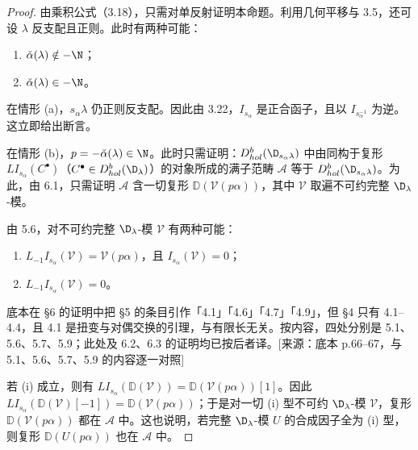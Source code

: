 \begin{proof}
由乘积公式（3.18），只需对单反射证明本命题。利用几何平移与 3.5，还可设 $\lambda$ 反支配且正则。此时有两种可能：
\begin{enumerate}[label=(\alph*)]
\item $\check{\alpha}(\lambda)\notin-\N$；
\item $\check{\alpha}(\lambda)\in-\N$。
\end{enumerate}
在情形 (a)，$s_\alpha\lambda$ 仍正则反支配。因此由 3.22，$I_{s_\alpha}$ 是正合函子，且以 $I_{s_\alpha^{-1}}$ 为逆。这立即给出断言。

在情形 (b)，$p=-\check{\alpha}(\lambda)\in\N$。此时只需证明：$D^b_{hol}(\D_{s_\alpha\lambda})$ 中由同构于复形 $LI_{s_\alpha}(C^\bullet)$（$C^\bullet\in D^b_{hol}(\D_\lambda)$）的对象所成的满子范畴 $\mathcal{A}$ 等于 $D^b_{hol}(\D_{s_\alpha\lambda})$。为此，由 6.1，只需证明 $\mathcal{A}$ 含一切复形 $\mathbb{D}(\mathcal{V}(p\alpha))$，其中 $\mathcal{V}$ 取遍不可约完整 $\D_\lambda$-模。

由 5.6，对不可约完整 $\D_\lambda$-模 $\mathcal{V}$ 有两种可能：
\begin{enumerate}[label=(\roman*)]
\item $L_{-1}I_{s_\alpha}(\mathcal{V})=\mathcal{V}(p\alpha)$，且 $I_{s_\alpha}(\mathcal{V})=0$；
\item $L_{-1}I_{s_\alpha}(\mathcal{V})=0$。
\end{enumerate}
\begin{annote}
底本在 §6 的证明中把 §5 的条目引作「4.1」「4.6」「4.7」「4.9」，但 §4 只有 4.1–4.4，且 4.1 是扭变与对偶交换的引理，与有限长无关。按内容，四处分别是 5.1、5.6、5.7、5.9；此处及 6.2、6.3 的证明均已按后者译。[来源：底本 p.66–67，与 5.1、5.6、5.7、5.9 的内容逐一对照]
\end{annote}
若 (i) 成立，则有 $LI_{s_\alpha}(\mathbb{D}(\mathcal{V}))=\mathbb{D}(\mathcal{V}(p\alpha))[1]$。因此 $LI_{s_\alpha}(\mathbb{D}(\mathcal{V})[-1])=\mathbb{D}(\mathcal{V}(p\alpha))$；于是对一切 (i) 型不可约 $\D_\lambda$-模 $\mathcal{V}$，复形 $\mathbb{D}(\mathcal{V}(p\alpha))$ 都在 $\mathcal{A}$ 中。这也说明，若完整 $\D_\lambda$-模 $U$ 的合成因子全为 (i) 型，则复形 $\mathbb{D}(U(p\alpha))$ 也在 $\mathcal{A}$ 中。


\end{proof}
